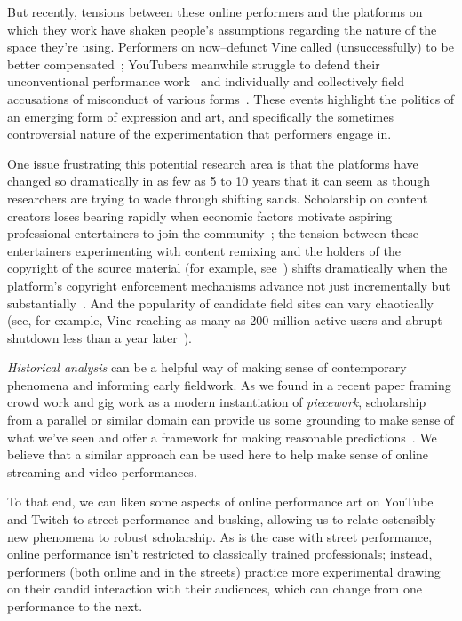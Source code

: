 \documentclass[10pt]{article}
\begin{document}
But recently, tensions between these online performers and the platforms on which they work have shaken people's
assumptions regarding the nature of the space they're using.
Performers on now--defunct Vine called (unsuccessfully) to be better compensated~\cite{vineWantsMoney,vineInsiderMeeting};
YouTubers meanwhile struggle to defend their unconventional performance work~\cite{h3h3Lawsuit}
and individually and collectively field accusations of misconduct of various forms~\cite{youtubeDramaResponses}.
These events highlight the politics of an emerging form of expression and art,
and specifically the sometimes controversial nature of the experimentation that performers engage in.

One issue frustrating this potential research area is that
the platforms have changed so dramatically in as few as 5 to 10 years that
it can seem as though researchers are trying to wade through shifting sands.
Scholarship on content creators loses bearing rapidly when
economic factors motivate aspiring professional entertainers to join the community~\cite{Hamilton:2014:STF:2611105.2557048};
the tension between these entertainers experimenting with content remixing and
the holders of the copyright of the source material
(for example, see~\cite{Hilderbrand48})
shifts dramatically when
the platform's copyright enforcement mechanisms advance
not just incrementally but substantially~\cite{kim2012institutionalization}.
And the popularity of candidate field sites can vary chaotically
(see, for example, Vine reaching as many as 200 million active users and
abrupt shutdown less than a year later~\cite{vineDecline}).

\textit{Historical analysis}
can be a helpful way of
making sense of contemporary phenomena and informing early fieldwork.
As we found in a recent paper framing crowd work and gig work as a modern instantiation of \textit{piecework},
scholarship from a parallel or similar domain can
provide us some grounding to make sense of what we've seen and offer a framework for making reasonable predictions~\cite{pieceworkCrowdworkGigwork}.
We believe that a similar approach can be used here to help make sense of online streaming and video performances.

To that end, we can liken some aspects of online performance art on YouTube and Twitch
to street performance and busking,
allowing us to relate ostensibly new phenomena to robust scholarship.
As is the case with street performance,
online performance isn't restricted to classically trained professionals;
instead, performers (both online and in the streets) practice more experimental 
drawing on their candid interaction with their audiences,
which can change from one performance to the next.
\end{document}
